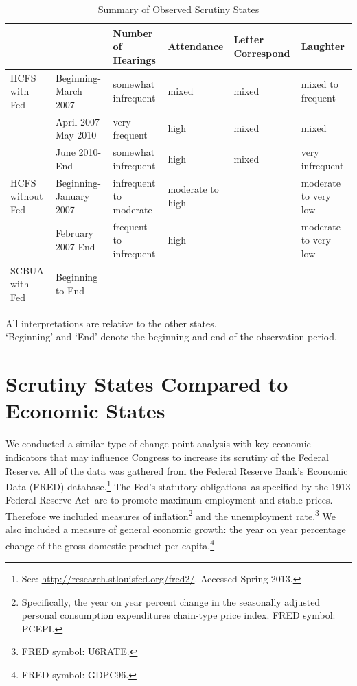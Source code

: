 \documentclass[a4paper]{article}\usepackage[]{graphicx}\usepackage[]{color}
\begin{document}
\begin{table}
  \caption{Summary of Observed Scrutiny States}
  \label{ObservedTable}
  \begin{center}
    \begin{tabular}{p{1.5cm} p{2.2cm} | p{2cm} p{2cm} p{2cm} p{2cm}}
    \hline
    & & Number of Hearings & Attendance & Letter Correspond & Laughter \\
    \hline \hline
    HCFS with Fed & Beginning-March 2007 & somewhat infrequent & mixed & mixed & mixed to frequent \\[0.3cm]
    & April 2007-May 2010 & very frequent & high & mixed & mixed \\[0.3cm]
    & June 2010-End & somewhat infrequent & high & mixed & very infrequent \\[0.3cm]
    HCFS without Fed &  Beginning-January 2007 & infrequent to moderate & moderate to high & & moderate to very low \\[0.3cm]
    & February 2007-End & frequent to infrequent & high & & moderate to very low \\[0.3cm]
    SCBUA with Fed & Beginning to End & & &\\[0.3cm]
    \hline
    \end{tabular}
  \end{center}
  {\scriptsize{All interpretations are relative to the other states. \\ `Beginning' and `End' denote the beginning and end of the observation period.}}
\end{table}

\section{Scrutiny States Compared to Economic States}

We conducted a similar type of change point analysis with key economic indicators that may influence Congress to increase its scrutiny of the Federal Reserve. All of the data was gathered from the Federal Reserve Bank's Economic Data (FRED) database.\footnote{See: \url{http://research.stlouisfed.org/fred2/}. Accessed Spring 2013.} The Fed's statutory obligations--as specified by the 1913 Federal Reserve Act--are to promote maximum employment and stable prices. Therefore we included measures of inflation\footnote{Specifically, the year on year percent change in the seasonally adjusted personal consumption expenditures chain-type price index. FRED symbol: PCEPI.} and the unemployment rate.\footnote{FRED symbol: U6RATE.} We also included a measure of general economic growth: the year on year percentage change of the gross domestic product per capita.\footnote{FRED symbol: GDPC96.} 
\end{document}
